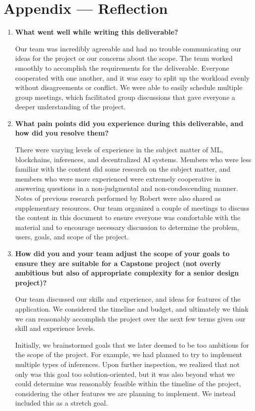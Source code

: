 \documentclass{article}
\begin{document}
\newpage{}

\section*{Appendix --- Reflection}



\begin{enumerate}
    \item \textbf{What went well while writing this deliverable?}

    Our team was incredibly agreeable and had no trouble communicating our ideas for the project or our concerns about the scope. The team worked smoothly to accomplish the requirements for the deliverable. Everyone cooperated with one another, and it was easy to split up the workload evenly without disagreements or conflict. We were able to easily schedule multiple group meetings, which facilitated group discussions that gave everyone a deeper understanding of the project.

    \item \textbf{What pain points did you experience during this deliverable, and how did you resolve them?}

    There were varying levels of experience in the subject matter of ML, blockchains, inferences, and decentralized AI systems. Members who were less familiar with the content did some research on the subject matter, and members who were more experienced were extremely cooperative in answering questions in a non-judgmental and non-condescending manner. Notes of previous research performed by Robert were also shared as supplementary resources. Our team organized a couple of meetings to discuss the content in this document to ensure everyone was comfortable with the material and to encourage necessary discussion to determine the problem, users, goals, and scope of the project.

    \item \textbf{How did you and your team adjust the scope of your goals to ensure they are suitable for a Capstone project (not overly ambitious but also of appropriate complexity for a senior design project)?}

    Our team discussed our skills and experience, and ideas for features of the application. We considered the timeline and budget, and ultimately we think we can reasonably accomplish the project over the next few terms given our skill and experience levels.

    Initially, we brainstormed goals that we later deemed to be too ambitious for the scope of the project. For example, we had planned to try to implement multiple types of inferences. Upon further inspection, we realized that not only was this goal too solution-oriented, but it was also beyond what we could determine was reasonably feasible within the timeline of the project, considering the other features we are planning to implement. We instead included this as a stretch goal.
\end{enumerate}
\end{document}

